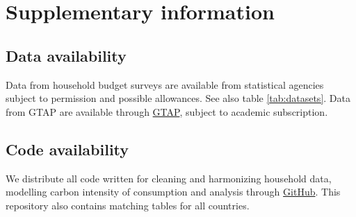 \documentclass[12pt, a4paper]{article}
\begin{document}
\begin{refsection}

\clearpage


\clearpage


\clearpage


\clearpage


\clearpage


\clearpage


\clearpage


\clearpage


\clearpage

\begin{refcontext}[sorting=nyt]
\printbibliography[heading=subbibliography, title ={References (Appendix)}]
\end{refcontext}
\end{refsection}

\clearpage

\section{Supplementary information}

\subsection{Data availability} \label{data_availability} Data from household budget surveys are available from statistical agencies subject to permission and possible allowances. See also table \ref{tab:datasets}. Data from GTAP are available through \href{https://www.gtap.agecon.purdue.edu/}{GTAP}, subject to academic subscription.  

\subsection{Code availability} \label{code}
We distribute all code written for cleaning and harmonizing household data, modelling carbon intensity of consumption and analysis through \href{https://github.com/lmissbach/Carbon-Intensity-2023}{GitHub}. This repository also contains matching tables for all countries.
\end{document}
